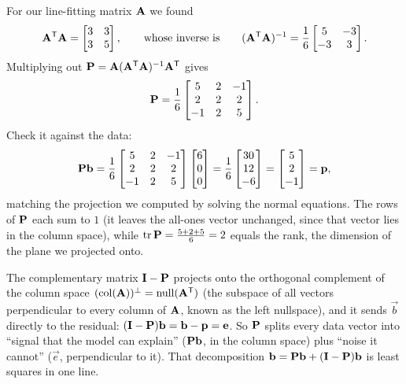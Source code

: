 \begin{example}\label{ch19:Pmatrix}
For our line-fitting matrix $\mathbf{A}$ we found
\[
  \mathbf{A}^{\mathsf{T}}\mathbf{A}=\begin{bmatrix}3&3\\3&5\end{bmatrix},
  \qquad\text{whose inverse is}\qquad
  (\mathbf{A}^{\mathsf{T}}\mathbf{A})^{-1}=\frac{1}{6}\begin{bmatrix}5&-3\\-3&3\end{bmatrix}.
\]
Multiplying out
$\mathbf{P}=\mathbf{A}(\mathbf{A}^{\mathsf{T}}\mathbf{A})^{-1}\mathbf{A}^{\mathsf{T}}$ gives
\[
  \mathbf{P}=\frac16\begin{bmatrix} 5 & 2 & -1\\ 2 & 2 & 2\\ -1 & 2 & 5\end{bmatrix}.
\]
Check it against the data:
\[
  \mathbf{P}\mathbf{b}=\frac16\begin{bmatrix}5&2&-1\\2&2&2\\-1&2&5\end{bmatrix}\begin{bmatrix}6\\0\\0\end{bmatrix}
  =\frac16\begin{bmatrix}30\\12\\-6\end{bmatrix}=\begin{bmatrix}5\\2\\-1\end{bmatrix}=\mathbf{p},
\]
matching the projection we
computed by solving the normal equations. The rows of $\mathbf{P}$ each sum to $1$ (it leaves the
all-ones vector unchanged, since that vector lies in the column space), while $\operatorname{tr}\mathbf{P}
=\tfrac{5+2+5}{6}=2$ equals the rank, the dimension of the plane we projected onto.
\end{example}

\begin{remark}
The complementary matrix $\mathbf{I}-\mathbf{P}$ projects onto the orthogonal complement of the column
space $(\operatorname{col}(\mathbf{A}))^\perp = \operatorname{null}(\mathbf{A}^{\mathsf{T}})$ (the subspace of all vectors perpendicular to
every column of $\mathbf{A}$, known as the left nullspace), and it sends $\vec{b}$ directly to the
residual: $(\mathbf{I}-\mathbf{P})\mathbf{b}=\mathbf{b}-\mathbf{p}=\mathbf{e}$. So $\mathbf{P}$ splits every data vector
into ``signal that the model can explain'' ($\mathbf{P}\mathbf{b}$, in the column space) plus ``noise it
cannot'' ($\vec{e}$, perpendicular to it). That decomposition $\mathbf{b}=\mathbf{P}\mathbf{b}
+(\mathbf{I}-\mathbf{P})\mathbf{b}$ is least squares in one line.
\end{remark}

